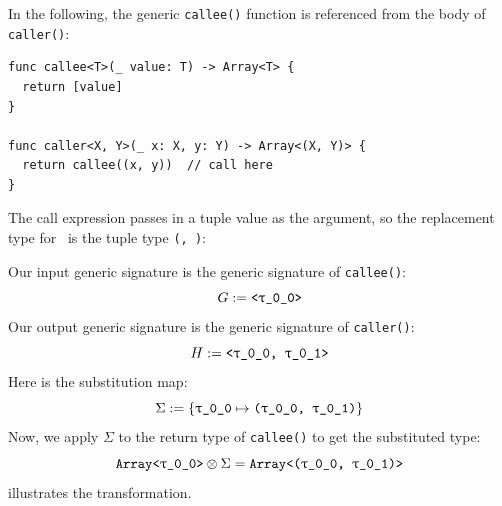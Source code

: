 \documentclass[../generics]{subfiles}
\begin{document}
\begin{example}
In the following, the generic \texttt{callee()} function is referenced from the body of \texttt{caller()}:
\begin{Verbatim}
func callee<T>(_ value: T) -> Array<T> {
  return [value]
}

func caller<X, Y>(_ x: X, y: Y) -> Array<(X, Y)> {
  return callee((x, y))  // call here
}
\end{Verbatim}
The call expression passes in a tuple value as the argument, so the replacement type for \rT\ is the tuple type \texttt{(\rT, \rU)}:
\begin{center}
\end{center}
Our input generic signature is the generic signature of \texttt{callee()}:
\[ G := \texttt{<\rT>} \]
Our output generic signature is the generic signature of \texttt{caller()}:
\[ H := \texttt{<\rT, \rU>} \]
Here is the substitution map:
\[ \Sigma := \{ \SubstType{\rT}{(\rT, \rU)} \} \]
Now, we apply $\Sigma$ to the return type of \texttt{callee()} to get the substituted type:
\[ \texttt{Array<\rT>} \otimes \Sigma = \texttt{Array<(\rT, \rU)>} \]
 illustrates the transformation.
\end{example}
\end{document}

